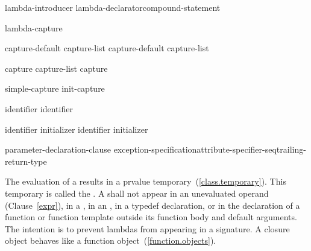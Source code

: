 \begin{bnf}
\br
    lambda-introducer lambda-declarator\opt compound-statement
\end{bnf}

\begin{bnf}
\br
    \terminal{[} lambda-capture\opt \terminal{]}
\end{bnf}

\begin{bnf}
\br
    capture-default\br
    capture-list\br
    capture-default \terminal{,} capture-list
\end{bnf}

\begin{bnf}
\br
    \terminal{\&}\br
    \terminal{=}
\end{bnf}

\begin{bnf}
\br
    capture \br
    capture-list \terminal{,} capture 
\end{bnf}

\begin{bnf}
\br
    simple-capture\br
    init-capture
\end{bnf}

\begin{bnf}
\br
    identifier\br
    \terminal{\&} identifier\br
\end{bnf}

\begin{bnf}
\br
    identifier initializer\br
    \terminal{\&} identifier initializer
\end{bnf}

\begin{bnf}
\br
    \terminal{(} parameter-declaration-clause \terminal{)} \opt\br
    \hspace*{\bnfindentinc}exception-specification\opt attribute-specifier-seq\opt trailing-return-type\opt
\end{bnf}

\pnum
The evaluation of a  results in a prvalue
temporary~(\ref{class.temporary}). This temporary is called the . A
 shall not appear in an unevaluated operand
(Clause~\ref{expr}), in a ,
in an ,
in a typedef declaration, or in the declaration of a function or function
template outside its function body and default arguments.
\enternote
The intention is to prevent lambdas from appearing in a signature.
\exitnote
\enternote
A closure object behaves like a function
object~(\ref{function.objects}).\exitnote

